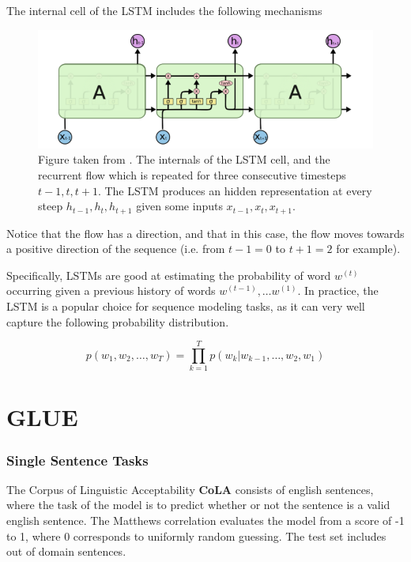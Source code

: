 \documentclass[a4paper,12pt,oneside,openright]{report}
\begin{document}
The internal cell of the LSTM includes the following mechanisms

\begin{figure}[h]
	\center
  \includegraphics[width=\linewidth]{./assets/background/LSTM.png}
  \caption{Figure taken from \cite{colahLSTM}. The internals of the LSTM cell, and the recurrent flow which is repeated for three consecutive timesteps $t-1, t, t+1$. 
  The LSTM produces an hidden representation at every steep $h_{t-1}, h_{t}, h_{t+1}$ given some inputs $x_{t-1}, x_t, x_{t+1}$.
  }
  \label{fig:lstm_internals}
\end{figure}

Notice that the flow has a direction, and that in this case, the flow moves towards a positive direction of the sequence (i.e. from $t-1 = 0$ to $t + 1 = 2$ for example).

Specifically, LSTMs \cite{hochreiter97} are good at estimating the probability of word $w^{(t)}$ occurring given a previous history of words $w^{(t-1)}, \ldots w^{(1)}$.
In practice, the LSTM is a popular choice for sequence modeling tasks, as it can very well capture the following probability distribution.

\begin{equation}
p\left(w_{1},  w_{2}, \ldots, w_{T} \right)=\prod_{k=1}^{T} p\left(w_{k} | w_{k-1}, \ldots, w_{2}, w_{1}\right)
\end{equation}

\section{GLUE}\label{appendix:GLUE}

\subsubsection{Single Sentence Tasks}

The Corpus of Linguistic Acceptability \textbf{CoLA} \cite{warstadt2018} consists of english sentences, where the task of the model is to predict whether or not the sentence is a valid english sentence.
The Matthews correlation evaluates the model from a score of -1 to 1, where 0 corresponds to uniformly random guessing.
The test set includes out of domain sentences.
\end{document}
